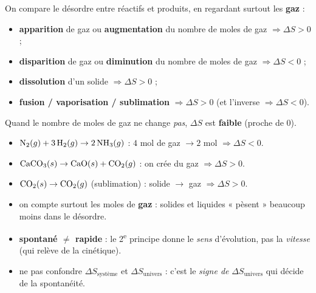 \documentclass[11pt,a4paper]{article}
\begin{document}
\begin{methode}
On compare le désordre entre réactifs et produits, en regardant surtout les \textbf{gaz} :
\begin{itemize}[leftmargin=1.6em,topsep=2pt,itemsep=1.5pt]
  \item \textbf{apparition} de gaz ou \textbf{augmentation} du nombre de moles de gaz $\Rightarrow \Delta S>0$ ;
  \item \textbf{disparition} de gaz ou \textbf{diminution} du nombre de moles de gaz $\Rightarrow \Delta S<0$ ;
  \item \textbf{dissolution} d'un solide $\Rightarrow \Delta S>0$ ;
  \item \textbf{fusion / vaporisation / sublimation} $\Rightarrow \Delta S>0$ (et l'inverse $\Rightarrow \Delta S<0$).
\end{itemize}
Quand le nombre de moles de gaz ne change \emph{pas}, $\Delta S$ est \textbf{faible} (proche de $0$).
\end{methode}

\begin{exemplebox}
\begin{itemize}[leftmargin=1.6em,topsep=2pt,itemsep=1.5pt]
  \item $\ce{N2}(g) + 3\,\ce{H2}(g) \rightarrow 2\,\ce{NH3}(g)$ : $4$ mol de gaz $\to 2$ mol $\Rightarrow \Delta S<0$.
  \item $\ce{CaCO3}(s) \rightarrow \ce{CaO}(s) + \ce{CO2}(g)$ : on crée du gaz $\Rightarrow \Delta S>0$.
  \item $\ce{CO2}(s) \rightarrow \ce{CO2}(g)$ (sublimation) : solide $\to$ gaz $\Rightarrow \Delta S>0$.
\end{itemize}
\end{exemplebox}

\begin{piege}
\begin{itemize}[leftmargin=1.6em,topsep=2pt,itemsep=2pt]
  \item on compte surtout les moles de \textbf{gaz} : solides et liquides « pèsent » beaucoup moins dans le désordre.
  \item \textbf{spontané $\ne$ rapide} : le 2\textsuperscript{e} principe donne le \emph{sens} d'évolution, pas la \emph{vitesse} (qui relève de la cinétique).
  \item ne pas confondre $\Delta S_{\text{système}}$ et $\Delta S_{\text{univers}}$ : c'est le \emph{signe de} $\Delta S_{\text{univers}}$ qui décide de la spontanéité.
\end{itemize}
\end{piege}
\end{document}
